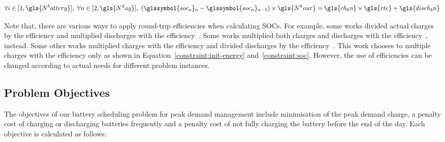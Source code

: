\begin{itemize}
	\begin{equation}
		\label{constraint:soc}
		\forall i \in [1, \gls{N^battery}], ~\forall n \in [2, \gls{N^day}], ~ (\glssymbol{soc_n} \text{}_n - \glssymbol{soc_n} \text{}_{n-1} ) \times \gls{N^hour} = \gls{ch_bn} \times \gls{rte} + \gls{disch_bn}
	\end{equation}
	
	
	
\end{itemize}

Note that, there are various ways to apply round-trip efficiencies when calculating \glspl{SOC}. For example, some works divided actual charges by the efficiency and multiplied discharges with the efficiency~\cite{Couraud2020, Maheshwari2020}. Some works multiplied both charges and discharges with the efficiency~\cite{Adika2014}, instead. Some other works multiplied charges with the efficiency and divided discharges by the efficiency~\cite{Pandzic2019,GonzalezCastellanos2020}. This work chooses to multiple charges with the efficiency only as shown in Equation~\ref{constraint:init-energy} and~\ref{constraint:soc}. However, the use of efficiencies can be changed according to actual needs for different problem instances.  


\subsection{Problem Objectives}
\label{pdm:problem:objectives}
The objectives of our battery scheduling problem for peak demand management include minimisation of the peak demand charge, a penalty cost of charging or discharging batteries frequently and a penalty cost of not fully charging the battery before the end of the day. Each objective is calculated as follows: 

